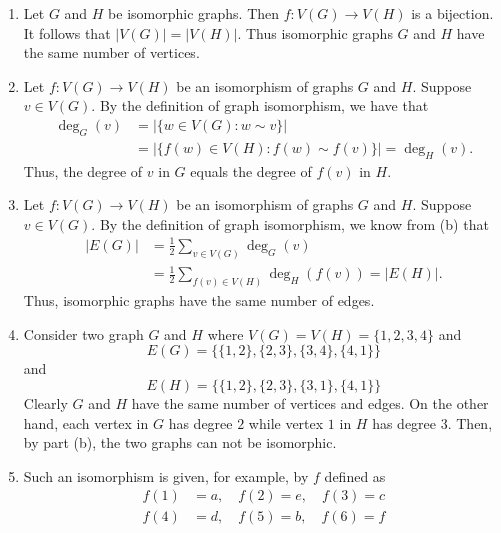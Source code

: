 \documentclass{article}
\theoremstyle{definition}
\begin{document}
\begin{solution}
    \begin{enumerate}
        \item  Let  $G$ and $H$ be isomorphic graphs.  Then $f \colon V(G) \to
            V(H)$ is a bijection.  It  follows that $|V(G)| = |V(H)|$.  Thus
            isomorphic graphs $G$ and $H$ have the same number of vertices.

        \item Let $f \colon V(G) \to V(H)$ be an isomorphism of
            graphs $G$ and $H$.  Suppose $v \in V(G)$.  By the definition of
            graph isomorphism, we have that
            \begin{align*}
                \deg_G(v) &= |\{w \in V(G) : w \sim v\}|
                        \\&= |\{f(w) \in V(H) : f(w) \sim f(v)\}| = \deg_H(v).
            \end{align*}
            Thus, the degree of $v$ in $G$ equals the degree of $f(v)$ in $H$.

        \item Let $f \colon V(G) \to V(H)$ be an isomorphism of
            graphs $G$ and $H$.  Suppose $v \in V(G)$.  By the definition of
            graph isomorphism, we know from (b) that
            \begin{align*}
                |E(G)| &= \frac{1}{2}\sum_{v \in V(G)} \deg_G(v)
                    \\&= \frac{1}{2}\sum_{f(v) \in V(H)} \deg_H(f(v)) = |E(H)|.
            \end{align*}
            Thus, isomorphic graphs have the same number of edges.

        \item Consider two graph $G$ and $H$ where $V(G) = V(H) = \{1,2,3,4\}$
            and
            \[
                E(G) = \{ \{1,2\}, \{2,3\}, \{3,4\}, \{4,1\} \}
            \]
            and
            \[
                E(H) =  \{ \{1,2\}, \{2,3\}, \{3,1\}, \{4,1\} \}
            \]
            Clearly $G$ and $H$ have the same number of vertices and edges. On
            the other hand, each vertex in $G$ has degree $2$ while vertex $1$
            in $H$ has degree $3$. Then, by part (b), the two graphs can not be
            isomorphic.

        \item Such an isomorphism is given, for example, by $f$ defined as
            \begin{align*}
                f(1) &= a, \quad f(2) = e, \quad f(3) = c
            \\  f(4) &= d, \quad f(5) = b, \quad f(6) = f
            \end{align*}
    \end{enumerate}
\end{solution}
\end{document}
